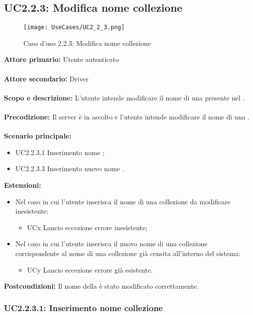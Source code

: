 \documentclass{scalatekids-article}
\begin{document}
\subsection{UC2.2.3: Modifica nome collezione}
\begin{figure}[H]
  \begin{center}
    \texttt{[image: UseCases/UC2\_2\_3.png]}
    \caption*{Caso d'uso 2.2.3: Modifica nome collezione}
  \end{center}
\end{figure}
\textbf{Attore primario:} Utente autenticato\\ \\
\textbf{Attore secondario:} Driver\\ \\
\textbf{Scopo e descrizione:} L’utente intende modificare il nome di una  presente nel .\\ \\
\textbf{Precodizione:} Il server è in ascolto e l’utente intende modificare il nome di una .\\ \\
\textbf{Scenario principale:}
\begin{itemize}
\item UC2.2.3.1 Inserimento nome ;
\item UC2.2.3.3 Inserimento nuovo nome .
\end{itemize}
\textbf{Estensioni:}
\begin{itemize}
\item Nel caso in cui l'utente inserisca il nome di una collezione da modificare inesistente:
  \begin{itemize}
  \item UCx Lancio eccezione errore  inesistente;
  \end{itemize}
\item Nel caso in cui l'utente inserisca il nuovo nome di una collezione corrispondente al nome di una collezione già censita all'interno del sistema:
  \begin{itemize}
  \item UCy Lancio eccezione errore  già esistente.
  \end{itemize}
\end{itemize}
\textbf{Postcondizioni:} Il nome della  è stato modificato correttamente.

\subsubsection{UC2.2.3.1: Inserimento nome collezione}
\end{document}
